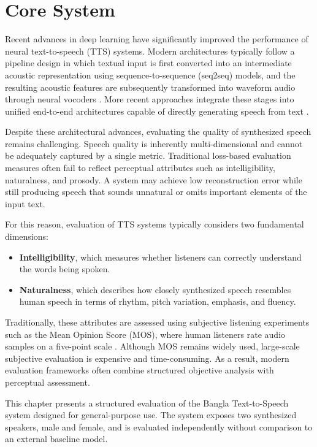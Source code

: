 \chapter{Core System}
\label{ch:system}

Recent advances in deep learning have significantly improved the performance of neural text-to-speech (TTS) systems. Modern architectures typically follow a pipeline design in which textual input is first converted into an intermediate acoustic representation using sequence-to-sequence (seq2seq) models, and the resulting acoustic features are subsequently transformed into waveform audio through neural vocoders \cite{shen2018natural, van2016wavenet}. More recent approaches integrate these stages into unified end-to-end architectures capable of directly generating speech from text \cite{mehrish2023review}.

Despite these architectural advances, evaluating the quality of synthesized speech remains challenging. Speech quality is inherently multi-dimensional and cannot be adequately captured by a single metric. Traditional loss-based evaluation measures often fail to reflect perceptual attributes such as intelligibility, naturalness, and prosody. A system may achieve low reconstruction error while still producing speech that sounds unnatural or omits important elements of the input text.

For this reason, evaluation of TTS systems typically considers two fundamental dimensions:

\begin{itemize}
\item \textbf{Intelligibility}, which measures whether listeners can correctly understand the words being spoken.
\item \textbf{Naturalness}, which describes how closely synthesized speech resembles human speech in terms of rhythm, pitch variation, emphasis, and fluency.
\end{itemize}

Traditionally, these attributes are assessed using subjective listening experiments such as the Mean Opinion Score (MOS), where human listeners rate audio samples on a five-point scale \cite{dall2014rating}. Although MOS remains widely used, large-scale subjective evaluation is expensive and time-consuming. As a result, modern evaluation frameworks often combine structured objective analysis with perceptual assessment.

This chapter presents a structured evaluation of the Bangla Text-to-Speech system designed for general-purpose use. The system exposes two synthesized speakers, male and female, and is evaluated independently without comparison to an external baseline model.

